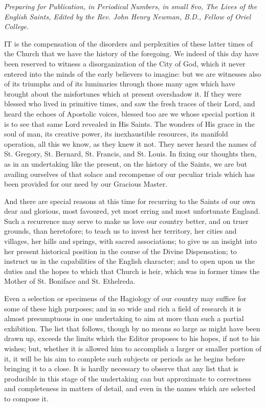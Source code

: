 \emph{Preparing for
Publication, in Periodical Numbers, in small 8vo, The Lives of the
English Saints, Edited by the Rev. John Henry Newman, B.D., Fellow of
Oriel College}.

IT is the
compensation of the disorders and perplexities of these latter times of
the Church that we have the history of the foregoing. We indeed of this
day have been reserved to witness a disorganization of the City of God,
which it never entered into the minds of the early believers to imagine:
but we are witnesses also of its triumphs and of its luminaries through
those many ages which have brought about the misfortunes which at
present overshadow it. If they were blessed who lived in primitive
times, and saw the fresh traces of their Lord, and heard the echoes of
Apostolic voices, blessed too are we whose special portion it is to see
that same Lord revealed in His Saints. The wonders of His grace in the
soul of man, its creative power, its inexhaustible resources, its
manifold operation, all this we know, as they knew it not. They
never heard the names of St. Gregory, St. Bernard, St. Francis, and St.
Louis. In fixing our thoughts then, as in an undertaking like the
present, on the history of the Saints, we are but availing ourselves of
that solace and recompense of our peculiar trials which has been
provided for our need by our Gracious Master.

And there are special reasons at this time for
recurring to the Saints of our own dear and glorious, most favoured, yet
most erring and most unfortunate England. Such a recurrence may serve to
make us love our country better, and on truer grounds, than heretofore;
to teach us to invest her territory, her cities and villages, her hills
and springs, with sacred associations; to give us an insight into her
present historical position in the course of the Divine Dispensation; to
instruct us in the capabilities of the English character; and to open
upon us the duties and the hopes to which that Church is heir, which was
in former times the Mother of St. Boniface and St. Ethelreda.

Even a selection or specimens of the Hagiology of
our country may suffice for some of these high purposes; and in so wide
and rich a field of research it is almost presumptuous in one
undertaking to aim at more than such a partial exhibition. The list that
follows, though by no means so large as might have been drawn up,
exceeds the limits which the Editor proposes to his hopes, if not to his
wishes; but, whether it is allowed him to accomplish a larger or smaller
portion of it, it will be his aim to complete such subjects or periods
as he begins before bringing it to a close. It is hardly necessary to
observe that any list that is producible in this stage of the
undertaking can but approximate to correctness and completeness in
matters of detail, and even in the names which are selected to compose
it.

